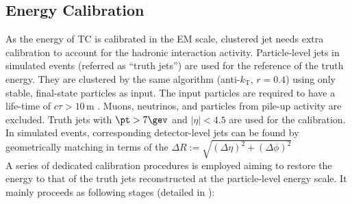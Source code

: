 \subsection{Energy Calibration} \label{sec::objDef::jets::calib}
As the energy of TC is calibrated in the EM scale, clustered jet needs extra calibration to account for the hadronic interaction activity. Particle-level jets in simulated events (referred as ``truth jets'') are used for the reference of the truth energy. They are clustered by the same algorithm (anti-$k_{\mathrm{T}}$, $r=0.4$) using only stable, final-state particles as input. The input particles are required to have a life-time of $c\tau > 10 \, \mathrm{m}$ . Muons, neutrinos, and particles from pile-up activity are excluded. Truth jets with $\pt>7\gev$ and $|\eta|<4.5$ are used for the calibration. In simulated events, corresponding detector-level jets can be found by geometrically matching in  terms of the $\Delta R := \sqrt{(\Delta \eta)^2+(\Delta \phi)^2}$ \\

A series of dedicated calibration procedures is employed
aiming to restore the energy to that of the truth jets reconstructed at the particle-level energy scale. It mainly proceeds as following stages (detailed in \cite{144_JESmeas_2015data}):


